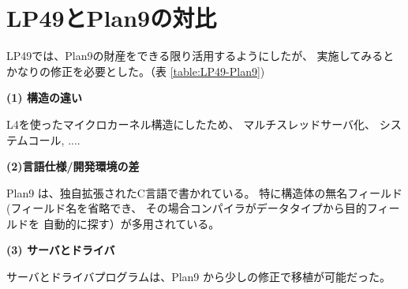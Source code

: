 \documentclass[draft]{ipsjpapers}
\begin{document}

\section{LP49とPlan9の対比 }

LP49では、Plan9の財産をできる限り活用するようにしたが、
実施してみるとかなりの修正を必要とした。（表 \ref{table:LP49-Plan9})

{\bf (1) 構造の違い}

L4を使ったマイクロカーネル構造にしたため、
マルチスレッドサーバ化、
システムコール,
....

{\bf (2)言語仕様/開発環境の差}

Plan9 は、独自拡張されたC言語で書かれている。
特に構造体の無名フィールド (フィールド名を省略でき、
その場合コンパイラがデータタイプから目的フィールドを
自動的に探す）が多用されている。


{\bf (3) サーバとドライバ}

サーバとドライバプログラムは、Plan9 から少しの修正で移植が可能だった。
\end{document}
